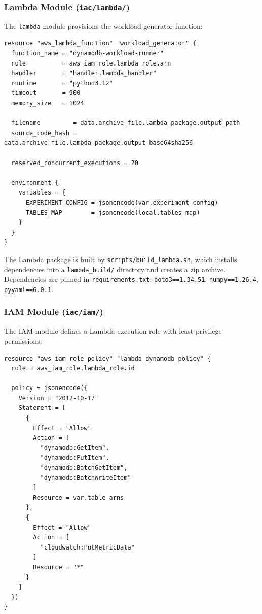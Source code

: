 \subsubsection{Lambda Module (\texttt{iac/lambda/})}

The \texttt{lambda} module provisions the workload generator function:

\begin{verbatim}
resource "aws_lambda_function" "workload_generator" {
  function_name = "dynamodb-workload-runner"
  role          = aws_iam_role.lambda_role.arn
  handler       = "handler.lambda_handler"
  runtime       = "python3.12"
  timeout       = 900
  memory_size   = 1024
  
  filename         = data.archive_file.lambda_package.output_path
  source_code_hash = data.archive_file.lambda_package.output_base64sha256
  
  reserved_concurrent_executions = 20
  
  environment {
    variables = {
      EXPERIMENT_CONFIG = jsonencode(var.experiment_config)
      TABLES_MAP        = jsonencode(local.tables_map)
    }
  }
}
\end{verbatim}

The Lambda package is built by \texttt{scripts/build\_lambda.sh}, which installs dependencies into a \texttt{lambda\_build/} directory and creates a zip archive. Dependencies are pinned in \texttt{requirements.txt}: \texttt{boto3==1.34.51}, \texttt{numpy==1.26.4}, \texttt{pyyaml==6.0.1}.

\subsubsection{IAM Module (\texttt{iac/iam/})}

The IAM module defines a Lambda execution role with least-privilege permissions:

\begin{verbatim}
resource "aws_iam_role_policy" "lambda_dynamodb_policy" {
  role = aws_iam_role.lambda_role.id
  
  policy = jsonencode({
    Version = "2012-10-17"
    Statement = [
      {
        Effect = "Allow"
        Action = [
          "dynamodb:GetItem",
          "dynamodb:PutItem",
          "dynamodb:BatchGetItem",
          "dynamodb:BatchWriteItem"
        ]
        Resource = var.table_arns
      },
      {
        Effect = "Allow"
        Action = [
          "cloudwatch:PutMetricData"
        ]
        Resource = "*"
      }
    ]
  })
}
\end{verbatim}

